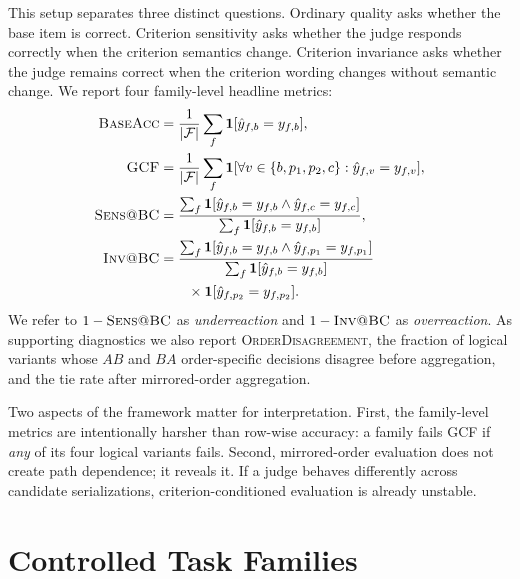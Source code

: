 \documentclass[11pt]{article}
\makeatletter
\newcommand{\baseacc}{\textsc{BaseAcc}\xspace}
\newcommand{\gcf}{\textsc{GCF}\xspace}
\newcommand{\sens}{\textsc{Sens@BC}\xspace}
\newcommand{\invbc}{\textsc{Inv@BC}\xspace}
\newcommand{\orderdis}{\textsc{OrderDisagreement}\xspace}
\makeatother
\begin{document}
This setup separates three distinct questions. Ordinary quality asks whether the base item is correct. Criterion sensitivity asks whether the judge responds correctly when the criterion semantics change. Criterion invariance asks whether the judge remains correct when the criterion wording changes without semantic change. We report four family-level headline metrics:
{\small
\begin{align}
\baseacc &= \frac{1}{|\mathcal{F}|}\sum_f \mathbf{1}[\hat y_{f,b}=y_{f,b}],\\
\gcf &= \frac{1}{|\mathcal{F}|}\sum_f \mathbf{1}[\forall v\in\{b,p_1,p_2,c\}:\hat y_{f,v}=y_{f,v}],\\
\sens &= \frac{\sum_f \mathbf{1}[\hat y_{f,b}=y_{f,b}\wedge \hat y_{f,c}=y_{f,c}]}{\sum_f \mathbf{1}[\hat y_{f,b}=y_{f,b}]},\\
\invbc &= \frac{\sum_f \mathbf{1}[\hat y_{f,b}=y_{f,b} \wedge \hat y_{f,p_1}=y_{f,p_1}]}{\sum_f \mathbf{1}[\hat y_{f,b}=y_{f,b}]} \\
&\qquad \times \mathbf{1}[\hat y_{f,p_2}=y_{f,p_2}].
\end{align}
}
We refer to $1-\sens$ as \emph{underreaction} and $1-\invbc$ as \emph{overreaction}. As supporting diagnostics we also report \orderdis, the fraction of logical variants whose $AB$ and $BA$ order-specific decisions disagree before aggregation, and the tie rate after mirrored-order aggregation.

Two aspects of the framework matter for interpretation. First, the family-level metrics are intentionally harsher than row-wise accuracy: a family fails \gcf if \emph{any} of its four logical variants fails. Second, mirrored-order evaluation does not create path dependence; it reveals it. If a judge behaves differently across candidate serializations, criterion-conditioned evaluation is already unstable.

\section{Controlled Task Families}
\label{sec:tasks}
\end{document}
